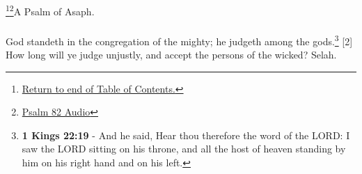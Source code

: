 \footnote{\textcolor[rgb]{0.00,0.25,0.00}{\hyperlink{PsalmsTOC}{Return to end of Table of Contents.}}}\footnote{\href{https://audiobible.com/bible/psalms_82.html}{\textcolor[cmyk]{0.99998,1,0,0}{Psalm 82 Audio}}}\textcolor[cmyk]{0.99998,1,0,0}{A Psalm of Asaph.}\\
\\
\textcolor[cmyk]{0.99998,1,0,0}{God standeth in the congregation of the mighty; he judgeth among the gods.}\footnote{\textbf{1 Kings 22:19} - And he said, Hear thou therefore the word of the LORD: I saw the LORD sitting on his throne, and all the host of heaven standing by him on his right hand and on his left.} %
[2] \textcolor[cmyk]{0.99998,1,0,0}{How long will ye judge unjustly, and accept the persons of the wicked? Selah.} %
